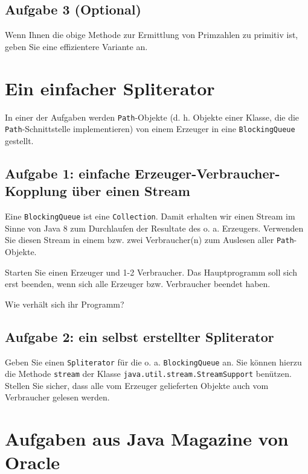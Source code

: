 \subsection{Aufgabe 3 (Optional)}\label{aufgabe-3-optional}

Wenn Ihnen die obige Methode zur Ermittlung von Primzahlen zu primitiv
ist, geben Sie eine effizientere Variante an.

\section{Ein einfacher Spliterator}\label{ein-einfacher-spliterator}

In einer der Aufgaben werden \texttt{Path}-Objekte (d. h.
Objekte einer Klasse, die die \texttt{Path}-Schnittstelle
implementieren) von einem Erzeuger in eine \texttt{BlockingQueue}
gestellt.

\subsection{Aufgabe 1: einfache Erzeuger-Verbraucher-Kopplung über einen
Stream}\label{aufgabe-1-einfache-erzeuger-verbraucher-kopplung-uxfcber-einen-stream}

Eine \texttt{BlockingQueue} ist eine \texttt{Collection}. Damit erhalten
wir einen Stream im Sinne von Java 8 zum Durchlaufen der Resultate des
o. a. Erzeugers. Verwenden Sie diesen Stream in einem bzw. zwei
Verbraucher(n) zum Auslesen aller \texttt{Path}-Objekte.

Starten Sie einen Erzeuger und 1-2 Verbraucher. Das Hauptprogramm soll
sich erst beenden, wenn sich alle Erzeuger bzw. Verbraucher beendet
haben.

Wie verhält sich ihr Programm?

\subsection{Aufgabe 2: ein selbst erstellter
Spliterator}\label{aufgabe-2-ein-selbst-erstellter-spliterator}

Geben Sie einen \texttt{Spliterator} für die o. a.
\texttt{BlockingQueue} an. Sie können hierzu die Methode \texttt{stream}
der Klasse \texttt{java.util.stream.StreamSupport} benützen. Stellen Sie
sicher, dass alle vom Erzeuger gelieferten Objekte auch vom Verbraucher
gelesen werden.

\section{Aufgaben aus Java Magazine von
Oracle}\label{aufgaben-aus-java-magazine-von-oracle}


